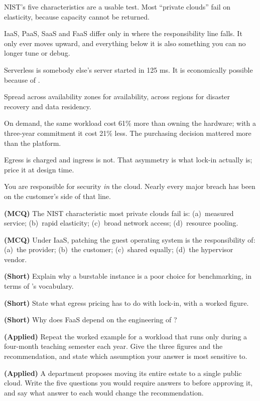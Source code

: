 \begin{chaptersummary}
\begin{tight}
  \item NIST's five characteristics are a usable test. Most ``private clouds''
        fail on elasticity, because capacity cannot be returned.
  \item IaaS, PaaS, SaaS and FaaS differ only in where the responsibility line
        falls. It only ever moves upward, and everything below it is also
        something you can no longer tune or debug.
  \item Serverless is somebody else's server started in 125 ms. It is
        economically possible because of .
  \item Spread across availability zones for availability, across regions for
        disaster recovery and data residency.
  \item On demand, the same workload cost 61\% more than owning the hardware;
        with a three-year commitment it cost 21\% less. The purchasing
        decision mattered more than the platform.
  \item Egress is charged and ingress is not. That asymmetry is what lock-in
        actually is; price it at design time.
  \item You are responsible for security \emph{in} the cloud. Nearly every
        major breach has been on the customer's side of that line.
\end{tight}
\end{chaptersummary}

\begin{reviewq}
  \item \textbf{(MCQ)} The NIST characteristic most private clouds fail is:
        (a)~measured service; (b)~rapid elasticity; (c)~broad network access;
        (d)~resource pooling.
  \item \textbf{(MCQ)} Under IaaS, patching the guest operating system is the
        responsibility of: (a)~the provider; (b)~the customer; (c)~shared
        equally; (d)~the hypervisor vendor.
  \item \textbf{(Short)} Explain why a burstable instance is a poor choice for
        benchmarking, in terms of 's vocabulary.
  \item \textbf{(Short)} State what egress pricing has to do with lock-in, with
        a worked figure.
  \item \textbf{(Short)} Why does FaaS depend on the engineering of
        ?
  \item \textbf{(Applied)} Repeat the worked example for a workload that runs
        only during a four-month teaching semester each year. Give the three
        figures and the recommendation, and state which assumption your answer
        is most sensitive to.
  \item \textbf{(Applied)} A department proposes moving its entire estate to a
        single public cloud. Write the five questions you would require answers
        to before approving it, and say what answer to each would change the
        recommendation.
\end{reviewq}

